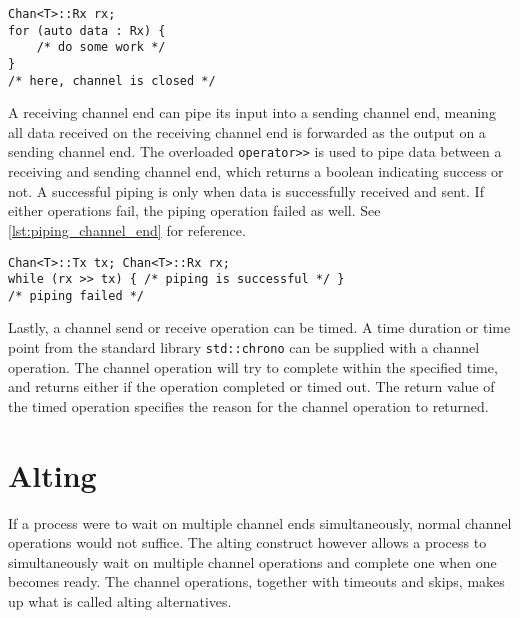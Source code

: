 \begin{lstfloat}
\begin{lstlisting}[caption={Range\hyp{}based for loops with the receving channel end.}, label={lst:range_based_for_loops_channel}, style={CustomC++}, xleftmargin={2em}]
Chan<T>::Rx rx;
for (auto data : Rx) {
    /* do some work */
}
/* here, channel is closed */
\end{lstlisting}
\end{lstfloat}

A receiving channel end can pipe its input into a sending channel end, meaning all data received on the receiving channel end is forwarded as the output on a sending channel end. The overloaded \lstinline[style={CustomC++}]|operator>>| is used to pipe data between a receiving and sending channel end, which returns a boolean indicating success or not. A successful piping is only when data is successfully received and sent. If either operations fail, the piping operation failed as well. See \cref{lst:piping_channel_end} for reference.


\begin{lstfloat}
\begin{lstlisting}[caption={Piping from a receiving to sending channel end object.}, label={lst:piping_channel_end}, style={CustomC++}, xleftmargin={2em}]
Chan<T>::Tx tx; Chan<T>::Rx rx;
while (rx >> tx) { /* piping is successful */ }
/* piping failed */
\end{lstlisting}
\end{lstfloat}

Lastly, a channel send or receive operation can be timed. A time duration or time point from the standard library \lstinline[style={CustomC++}]|std::chrono| can be supplied with a channel operation. The channel operation will try to complete within the specified time, and returns either if the operation completed or timed out. The return value of the timed operation specifies the reason for the channel operation to returned.


\section{Alting}


If a process were to wait on multiple channel ends simultaneously, normal channel operations would not suffice. The alting construct however allows a process to simultaneously wait on multiple channel operations and complete one when one becomes ready. The channel operations, together with timeouts and skips, makes up what is called alting alternatives.

